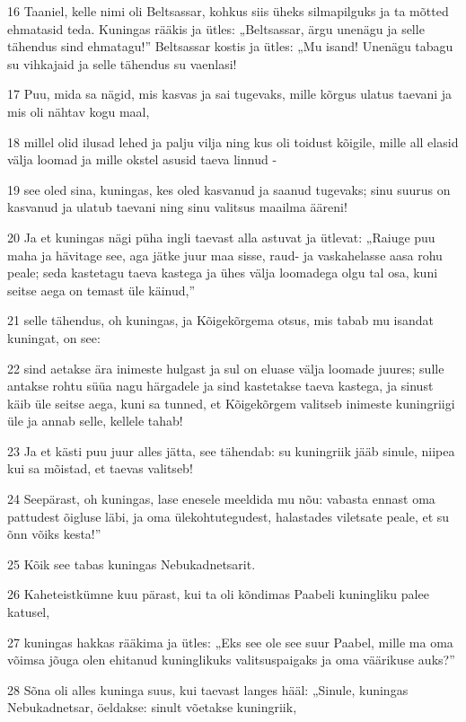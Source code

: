 \par 16 Taaniel, kelle nimi oli Beltsassar, kohkus siis üheks silmapilguks ja ta mõtted ehmatasid teda. Kuningas rääkis ja ütles: „Beltsassar, ärgu unenägu ja selle tähendus sind ehmatagu!” Beltsassar kostis ja ütles: „Mu isand! Unenägu tabagu su vihkajaid ja selle tähendus su vaenlasi!
\par 17 Puu, mida sa nägid, mis kasvas ja sai tugevaks, mille kõrgus ulatus taevani ja mis oli nähtav kogu maal,
\par 18 millel olid ilusad lehed ja palju vilja ning kus oli toidust kõigile, mille all elasid välja loomad ja mille okstel asusid taeva linnud -
\par 19 see oled sina, kuningas, kes oled kasvanud ja saanud tugevaks; sinu suurus on kasvanud ja ulatub taevani ning sinu valitsus maailma ääreni!
\par 20 Ja et kuningas nägi püha ingli taevast alla astuvat ja ütlevat: „Raiuge puu maha ja hävitage see, aga jätke juur maa sisse, raud- ja vaskahelasse aasa rohu peale; seda kastetagu taeva kastega ja ühes välja loomadega olgu tal osa, kuni seitse aega on temast üle käinud,”
\par 21 selle tähendus, oh kuningas, ja Kõigekõrgema otsus, mis tabab mu isandat kuningat, on see:
\par 22 sind aetakse ära inimeste hulgast ja sul on eluase välja loomade juures; sulle antakse rohtu süüa nagu härgadele ja sind kastetakse taeva kastega, ja sinust käib üle seitse aega, kuni sa tunned, et Kõigekõrgem valitseb inimeste kuningriigi üle ja annab selle, kellele tahab!
\par 23 Ja et kästi puu juur alles jätta, see tähendab: su kuningriik jääb sinule, niipea kui sa mõistad, et taevas valitseb!
\par 24 Seepärast, oh kuningas, lase enesele meeldida mu nõu: vabasta ennast oma pattudest õigluse läbi, ja oma ülekohtutegudest, halastades viletsate peale, et su õnn võiks kesta!”
\par 25 Kõik see tabas kuningas Nebukadnetsarit.
\par 26 Kaheteistkümne kuu pärast, kui ta oli kõndimas Paabeli kuningliku palee katusel,
\par 27 kuningas hakkas rääkima ja ütles: „Eks see ole see suur Paabel, mille ma oma võimsa jõuga olen ehitanud kuninglikuks valitsuspaigaks ja oma väärikuse auks?”
\par 28 Sõna oli alles kuninga suus, kui taevast langes hääl: „Sinule, kuningas Nebukadnetsar, öeldakse: sinult võetakse kuningriik,

